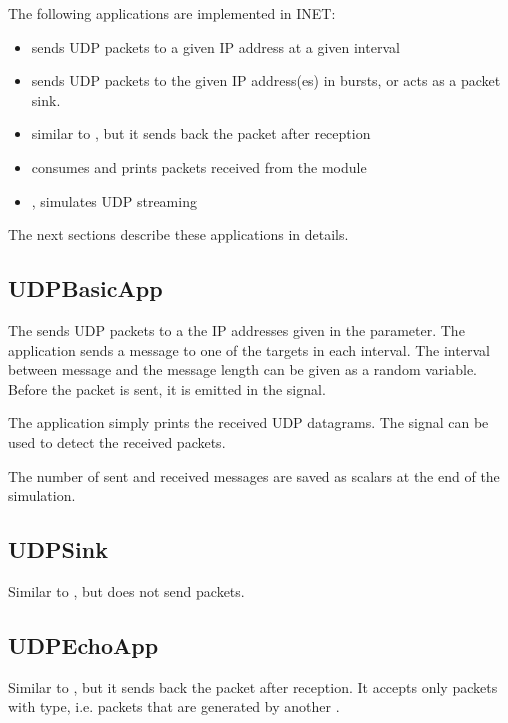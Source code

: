 The following applications are implemented in INET:
\begin{itemize}
\item {} sends UDP packets to a given IP address at a given interval
\item {} sends UDP packets to the given IP address(es) in bursts, or acts as a packet sink.
\item {} similar to , but it sends back the packet after reception
\item {} consumes and prints packets received from the  module
\item {}, simulates UDP streaming
\end{itemize}

The next sections describe these applications in details.

\subsection{UDPBasicApp}

The  sends UDP packets to a the IP addresses given in the
 parameter. The application sends a message to one of the
targets in each  interval. The interval between message and
the message length can be given as a random variable. Before the packet is
sent, it is emitted in the  signal.

The application simply prints the received UDP datagrams. The 
signal can be used to detect the received packets.

The number of sent and received messages are saved as scalars at the end of the
simulation.

\subsection{UDPSink}

Similar to , but does not send packets.

\subsection{UDPEchoApp}

Similar to , but it sends back the packet after reception.
It accepts only packets with  type, i.e. packets that
are generated by another .

